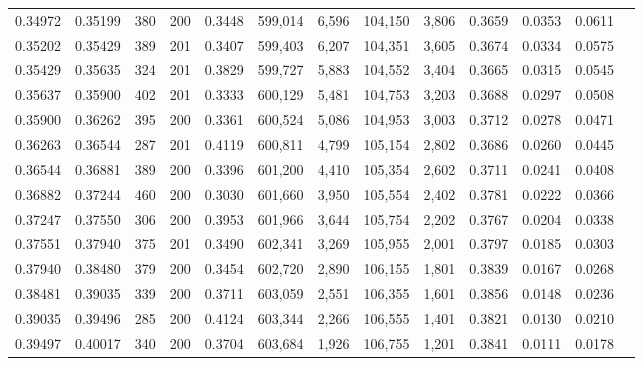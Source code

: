 \begin{tabular}{rrrrrrrrrrrrr}
0.34972 & 0.35199 &   380 & 200 &                                     0.3448 & 599,014 &   6,596 & 104,150 &   3,806 & 0.3659 & 0.0353 & 0.0611 \\
0.35202 & 0.35429 &   389 & 201 &                                     0.3407 & 599,403 &   6,207 & 104,351 &   3,605 & 0.3674 & 0.0334 & 0.0575 \\
0.35429 & 0.35635 &   324 & 201 &                                     0.3829 & 599,727 &   5,883 & 104,552 &   3,404 & 0.3665 & 0.0315 & 0.0545 \\
0.35637 & 0.35900 &   402 & 201 &                                     0.3333 & 600,129 &   5,481 & 104,753 &   3,203 & 0.3688 & 0.0297 & 0.0508 \\
0.35900 & 0.36262 &   395 & 200 &                                     0.3361 & 600,524 &   5,086 & 104,953 &   3,003 & 0.3712 & 0.0278 & 0.0471 \\
0.36263 & 0.36544 &   287 & 201 &                                     0.4119 & 600,811 &   4,799 & 105,154 &   2,802 & 0.3686 & 0.0260 & 0.0445 \\
0.36544 & 0.36881 &   389 & 200 &                                     0.3396 & 601,200 &   4,410 & 105,354 &   2,602 & 0.3711 & 0.0241 & 0.0408 \\
0.36882 & 0.37244 &   460 & 200 &                                     0.3030 & 601,660 &   3,950 & 105,554 &   2,402 & 0.3781 & 0.0222 & 0.0366 \\
0.37247 & 0.37550 &   306 & 200 &                                     0.3953 & 601,966 &   3,644 & 105,754 &   2,202 & 0.3767 & 0.0204 & 0.0338 \\
0.37551 & 0.37940 &   375 & 201 &                                     0.3490 & 602,341 &   3,269 & 105,955 &   2,001 & 0.3797 & 0.0185 & 0.0303 \\
0.37940 & 0.38480 &   379 & 200 &                                     0.3454 & 602,720 &   2,890 & 106,155 &   1,801 & 0.3839 & 0.0167 & 0.0268 \\
0.38481 & 0.39035 &   339 & 200 &                                     0.3711 & 603,059 &   2,551 & 106,355 &   1,601 & 0.3856 & 0.0148 & 0.0236 \\
0.39035 & 0.39496 &   285 & 200 &                                     0.4124 & 603,344 &   2,266 & 106,555 &   1,401 & 0.3821 & 0.0130 & 0.0210 \\
0.39497 & 0.40017 &   340 & 200 &                                     0.3704 & 603,684 &   1,926 & 106,755 &   1,201 & 0.3841 & 0.0111 & 0.0178 \\

\end{tabular}
